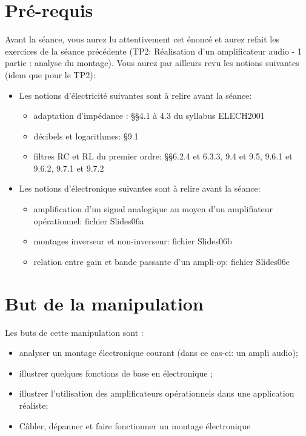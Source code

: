 \vspace{-5mm}
\section*{Pré-requis}
\vspace{-5mm}
Avant la séance, vous aurez lu attentivement cet énoncé et aurez refait les exercices de la séance précédente (TP2: Réalisation d'un amplificateur audio - 1 partie : analyse du montage).
Vous aurez par ailleurs revu les notions suivantes (idem que pour le TP2):\\
\begin{itemize}
\item Les notions d’électricité suivantes sont à relire avant la séance:
	\begin{itemize}
    \item adaptation d’impédance : §§4.1 à 4.3 du syllabus ELECH2001
	\item décibels et logarithmes: §9.1
	\item filtres RC et RL du premier ordre: §§6.2.4 et 6.3.3, 9.4 et 9.5, 9.6.1 et 9.6.2, 9.7.1 et 9.7.2
	\end{itemize}

\item Les notions d’électronique suivantes sont à relire avant la séance:
	\begin{itemize}
    \item amplification d’un signal analogique au moyen d’un amplifiateur opérationnel: fichier Slides06a
	\item montages inverseur et non-inverseur: fichier Slides06b
	\item relation entre gain et bande passante d’un ampli-op: fichier Slides06e
    \end{itemize}
\end{itemize}

\vspace{-5mm}
\section*{But de la manipulation}
\vspace{-5mm}
Les buts de cette manipulation sont :\\
\begin{itemize}
	\item analyser un montage électronique courant (dans ce cas-ci: un ampli audio);
	\item illustrer quelques fonctions de base en électronique ;
	\item illustrer l'utilisation des amplificateurs opérationnels dans une application réaliste;
    \item Câbler, dépanner et faire fonctionner un montage électronique
\end{itemize}

